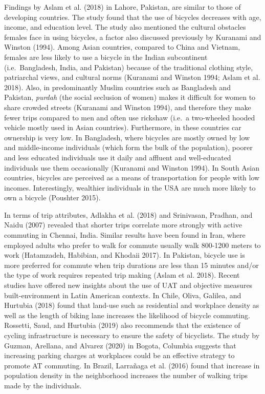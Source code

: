 \documentclass[]{elsarticle} %
\begin{document}
Findings by Aslam et al. (2018) in Lahore, Pakistan, are similar to
those of developing countries. The study found that the use of bicycles
decreases with age, income, and education level. The study also
mentioned the cultural obstacles females face in using bicycles, a
factor also discussed previously by Kuranami and Winston (1994). Among
Asian countries, compared to China and Vietnam, females are less likely
to use a bicycle in the Indian subcontinent (i.e.~Bangladesh, India, and
Pakistan) because of the traditional clothing style, patriarchal views,
and cultural norms (Kuranami and Winston 1994; Aslam et al. 2018). Also,
in predominantly Muslim countries such as Bangladesh and Pakistan,
\emph{purdah} (the social seclusion of women) makes it difficult for
women to share crowded streets (Kuranami and Winston 1994), and
therefore they make fewer trips compared to men and often use rickshaw
(i.e.~a two-wheeled hooded vehicle mostly used in Asian countries).
Furthermore, in these countries car ownership is very low. In
Bangladesh, where bicycles are mostly owned by low and middle-income
individuals (which form the bulk of the population), poorer and less
educated individuals use it daily and affluent and well-educated
individuals use them occasionally (Kuranami and Winston 1994). In South
Asian countries, bicycles are perceived as a means of transportation for
people with low incomes. Interestingly, wealthier individuals in the USA
are much more likely to own a bicycle (Poushter 2015).

In terms of trip attributes, Adlakha et al. (2018) and Srinivasan,
Pradhan, and Naidu (2007) revealed that shorter trips correlate more
strongly with active commuting in Chennai, India. Similar results have
been found in Iran, where employed adults who prefer to walk for commute
usually walk 800-1200 meters to work (Hatamzadeh, Habibian, and Khodaii
2017). In Pakistan, bicycle use is more preferred for commute when trip
durations are less than 15 minutes and/or the type of work requires
repeated trip making (Aslam et al. 2018). Recent studies have offered
new insights about the use of UAT and objective measures
built-environment in Latin American contexts. In Chile, Oliva, Galilea,
and Hurtubia (2018) found that land-use such as residential and
workplace density as well as the length of biking lane increases the
likelihood of bicycle commuting. Rossetti, Saud, and Hurtubia (2019)
also recommends that the existence of cycling infrastructure is
necessary to ensure the safety of bicyclists. The study by Guzman,
Arellana, and Alvarez (2020) in Bogota, Columbia suggests that
increasing parking charges at workplaces could be an effective strategy
to promote AT commuting. In Brazil, Larrañaga et al. (2016) found that
increase in population density in the neighborhood increases the number
of walking trips made by the individuals.
\end{document}
